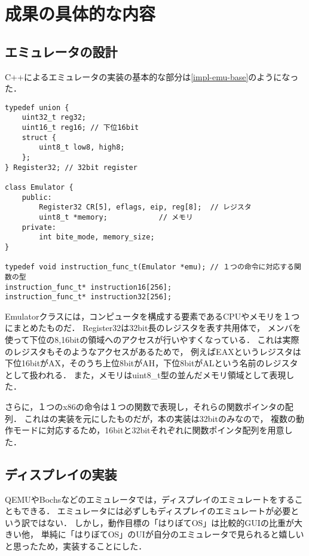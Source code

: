 \documentclass[10pt,a4j]{jsarticle}
\begin{document}
\section{成果の具体的な内容}

\subsection{エミュレータの設計}

C++によるエミュレータの実装の基本的な部分は\ref{impl-emu-base}のようになった．
\begin{lstlisting}[caption=エミュレータの基本的な実装,label=impl-emu-base]
typedef union {
	uint32_t reg32;
	uint16_t reg16; // 下位16bit
	struct {
		uint8_t low8, high8;
	};
} Register32; // 32bit register

class Emulator {
	public:
		Register32 CR[5], eflags, eip, reg[8];	// レジスタ
		uint8_t *memory;			// メモリ
	private:
		int bite_mode, memory_size;
}

typedef void instruction_func_t(Emulator *emu); // １つの命令に対応する関数の型
instruction_func_t* instruction16[256];
instruction_func_t* instruction32[256];
\end{lstlisting}
Emulatorクラスには，コンピュータを構成する要素であるCPUやメモリを１つにまとめたものだ．
Register32は32bit長のレジスタを表す共用体で，
メンバを使って下位の8,16bitの領域へのアクセスが行いやすくなっている．
これは実際のレジスタもそのようなアクセスがあるためで，
例えばEAXというレジスタは下位16bitがAX，そのうち上位8bitがAH，下位8bitがALという名前のレジスタとして扱われる．
また，メモリはuint8\_t型の並んだメモリ領域として表現した．

さらに，１つのx86の命令は１つの関数で表現し，それらの関数ポインタの配列．
これは\cite{learn-x86-by-emu}の実装を元にしたものだが，本の実装は32bitのみなので，
複数の動作モードに対応するため，16bitと32bitそれぞれに関数ポインタ配列を用意した．

\subsection{ディスプレイの実装}
QEMUやBochsなどのエミュレータでは，ディスプレイのエミュレートをすることもできる．
エミュレータには必ずしもディスプレイのエミュレートが必要という訳ではない．
しかし，動作目標の「はりぼてOS」は比較的GUIの比重が大きい他，
単純に「はりぼてOS」のUIが自分のエミュレータで見られると嬉しいと思ったため，実装することにした．
\end{document}
